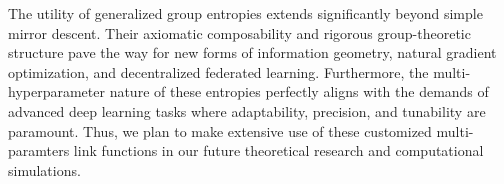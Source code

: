 \documentclass[10pt]{amsart}
\theoremstyle{definition}
\theoremstyle{definition}	 %
\begin{document}
%
%
%
%
%
%
%
%
%
%


The utility of generalized group entropies extends significantly beyond simple mirror descent. Their axiomatic composability and rigorous group-theoretic structure pave the way for new forms of information geometry, natural gradient optimization, and decentralized federated learning. Furthermore, the multi-hyperparameter nature of these entropies perfectly aligns with the demands of advanced deep learning tasks where adaptability, precision, and tunability are paramount. Thus, we plan to make extensive use of these customized multi-paramters link functions in our future theoretical research and computational simulations.
\end{document}
